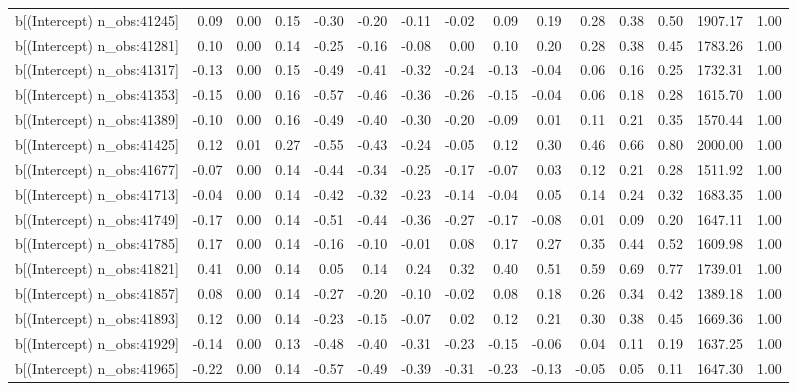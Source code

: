 \begin{table}[ht]
\begin{tabular}{rrrrrrrrrrrrrrr}
  b[(Intercept) n\_obs:41245] & 0.09 & 0.00 & 0.15 & -0.30 & -0.20 & -0.11 & -0.02 & 0.09 & 0.19 & 0.28 & 0.38 & 0.50 & 1907.17 & 1.00 \\ 
  b[(Intercept) n\_obs:41281] & 0.10 & 0.00 & 0.14 & -0.25 & -0.16 & -0.08 & 0.00 & 0.10 & 0.20 & 0.28 & 0.38 & 0.45 & 1783.26 & 1.00 \\ 
  b[(Intercept) n\_obs:41317] & -0.13 & 0.00 & 0.15 & -0.49 & -0.41 & -0.32 & -0.24 & -0.13 & -0.04 & 0.06 & 0.16 & 0.25 & 1732.31 & 1.00 \\ 
  b[(Intercept) n\_obs:41353] & -0.15 & 0.00 & 0.16 & -0.57 & -0.46 & -0.36 & -0.26 & -0.15 & -0.04 & 0.06 & 0.18 & 0.28 & 1615.70 & 1.00 \\ 
  b[(Intercept) n\_obs:41389] & -0.10 & 0.00 & 0.16 & -0.49 & -0.40 & -0.30 & -0.20 & -0.09 & 0.01 & 0.11 & 0.21 & 0.35 & 1570.44 & 1.00 \\ 
  b[(Intercept) n\_obs:41425] & 0.12 & 0.01 & 0.27 & -0.55 & -0.43 & -0.24 & -0.05 & 0.12 & 0.30 & 0.46 & 0.66 & 0.80 & 2000.00 & 1.00 \\ 
  b[(Intercept) n\_obs:41677] & -0.07 & 0.00 & 0.14 & -0.44 & -0.34 & -0.25 & -0.17 & -0.07 & 0.03 & 0.12 & 0.21 & 0.28 & 1511.92 & 1.00 \\ 
  b[(Intercept) n\_obs:41713] & -0.04 & 0.00 & 0.14 & -0.42 & -0.32 & -0.23 & -0.14 & -0.04 & 0.05 & 0.14 & 0.24 & 0.32 & 1683.35 & 1.00 \\ 
  b[(Intercept) n\_obs:41749] & -0.17 & 0.00 & 0.14 & -0.51 & -0.44 & -0.36 & -0.27 & -0.17 & -0.08 & 0.01 & 0.09 & 0.20 & 1647.11 & 1.00 \\ 
  b[(Intercept) n\_obs:41785] & 0.17 & 0.00 & 0.14 & -0.16 & -0.10 & -0.01 & 0.08 & 0.17 & 0.27 & 0.35 & 0.44 & 0.52 & 1609.98 & 1.00 \\ 
  b[(Intercept) n\_obs:41821] & 0.41 & 0.00 & 0.14 & 0.05 & 0.14 & 0.24 & 0.32 & 0.40 & 0.51 & 0.59 & 0.69 & 0.77 & 1739.01 & 1.00 \\ 
  b[(Intercept) n\_obs:41857] & 0.08 & 0.00 & 0.14 & -0.27 & -0.20 & -0.10 & -0.02 & 0.08 & 0.18 & 0.26 & 0.34 & 0.42 & 1389.18 & 1.00 \\ 
  b[(Intercept) n\_obs:41893] & 0.12 & 0.00 & 0.14 & -0.23 & -0.15 & -0.07 & 0.02 & 0.12 & 0.21 & 0.30 & 0.38 & 0.45 & 1669.36 & 1.00 \\ 
  b[(Intercept) n\_obs:41929] & -0.14 & 0.00 & 0.13 & -0.48 & -0.40 & -0.31 & -0.23 & -0.15 & -0.06 & 0.04 & 0.11 & 0.19 & 1637.25 & 1.00 \\ 
  b[(Intercept) n\_obs:41965] & -0.22 & 0.00 & 0.14 & -0.57 & -0.49 & -0.39 & -0.31 & -0.23 & -0.13 & -0.05 & 0.05 & 0.11 & 1647.30 & 1.00 \\ 

\end{tabular}
\end{table}

